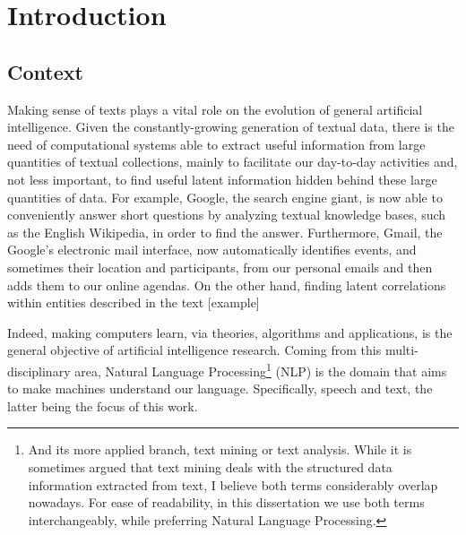 \chapter{Introduction}
\label{chap:intro}
\minitoc
\section{Context}

Making sense of texts plays a vital role on the evolution of general artificial intelligence. Given the constantly-growing generation of textual data, there is the need of computational systems able to extract useful information from large quantities of textual collections, mainly to facilitate our day-to-day activities and, not less important, to find useful latent information hidden behind these large quantities of data. For example, Google, the search engine giant, is now able to conveniently answer short questions by analyzing textual knowledge bases, such as the English Wikipedia, in order to find the answer. Furthermore, Gmail, the Google's electronic mail interface, now  automatically identifies events, and sometimes their location and participants, from our personal emails and then adds  them to our online agendas. On the other hand, finding latent correlations within entities described in the text [example]

Indeed, making computers learn,  via theories, algorithms and applications, is the general objective of artificial intelligence research. Coming from this multi-disciplinary area, Natural Language Processing\footnote{And its more applied branch, text mining or text analysis. While it is sometimes argued that text mining deals with the structured data information extracted from text, I believe both terms considerably overlap nowadays. For ease of readability, in this dissertation we use both terms interchangeably, while preferring Natural Language Processing.} (NLP) is the domain that aims to make machines understand our language. Specifically, speech and text, the latter being the focus of this work.

